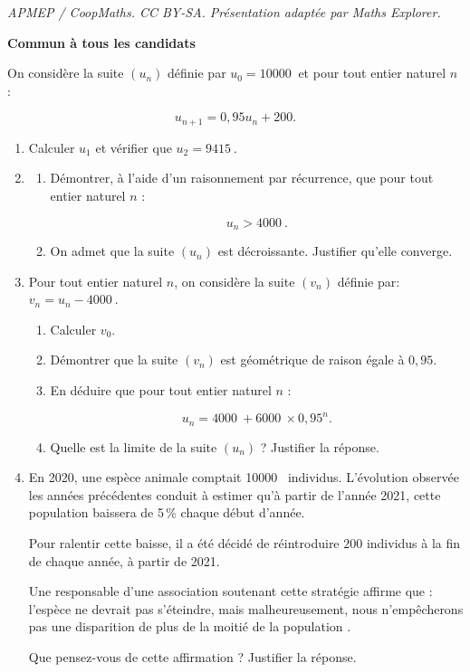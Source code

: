 \documentclass[10pt]{article}
\providecommand{\np}[2][]{{#2~#1}}
\begin{document}
\noindent\textit{APMEP / CoopMaths. CC BY-SA. Présentation adaptée par Maths Explorer.}\par\medskip
\textbf{Commun à tous les candidats}

\medskip

On considère la suite $\left(u_n\right)$ définie par $u_0 = \np{10000}$ et pour tout entier naturel $n$ : 

\[u_{n+1} = 0,95u_n + 200.\]

\begin{enumerate}
\item Calculer $u_1$ et vérifier que $u_2 = \np{9415}$. 
\item 
	\begin{enumerate}
		\item Démontrer, à l'aide d'un raisonnement par récurrence, que pour tout entier naturel $n$ :

\[u_n > \np{4000}.\]

		\item On admet que la suite $\left(u_n\right)$ est décroissante. Justifier qu'elle converge.
	\end{enumerate}
\item  Pour tout entier naturel $n$, on considère la suite $\left(v_n\right)$ définie par: $v_n = u_n - \np{4000}$.
	\begin{enumerate}
		\item Calculer $v_0$.
		\item Démontrer que la suite $\left(v_n\right)$ est géométrique de raison égale à $0,95$.
		\item En déduire que pour tout entier naturel $n$ :

\[u_n = \np{4000} + \np{6000} \times 0,95^n.\]

		\item Quelle est la limite de la suite $\left(u_n\right)$ ? Justifier la réponse.
	\end{enumerate}
\item En 2020, une espèce animale comptait \np{10000} individus. L'évolution observée les années précédentes conduit à estimer qu'à partir de l'année 2021, cette population baissera de 5\,\% chaque début d'année.

Pour ralentir cette baisse, il a été décidé de réintroduire $200$ individus à la fin de chaque année, à partir de 2021.

Une responsable d'une association soutenant cette stratégie affirme que : \og l'espèce ne devrait pas s'éteindre, mais malheureusement, nous n'empêcherons pas une disparition de plus de la moitié de la population \fg.

Que pensez-vous de cette affirmation ? Justifier la réponse.
\end{enumerate}

\bigskip
\end{document}
